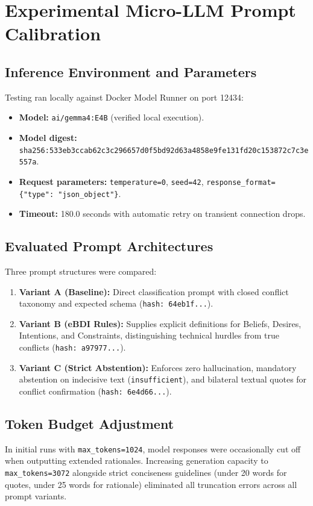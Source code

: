 \documentclass[11pt,a4paper]{article}
\begin{document}
\section{Experimental Micro-LLM Prompt Calibration}

\subsection{Inference Environment and Parameters}
Testing ran locally against Docker Model Runner on port 12434:
\begin{itemize}[itemsep=2pt]
    \item \textbf{Model:} \texttt{ai/gemma4:E4B} (verified local execution).
    \item \textbf{Model digest:} \texttt{sha256:533eb3ccab62c3c296657d0f5bd92d63a4858e9fe131fd20c153872c7c3e557a}.
    \item \textbf{Request parameters:} \texttt{temperature=0}, \texttt{seed=42}, \texttt{response\_format=\{"type": "json\_object"\}}.
    \item \textbf{Timeout:} 180.0 seconds with automatic retry on transient connection drops.
\end{itemize}

\subsection{Evaluated Prompt Architectures}
Three prompt structures were compared:
\begin{enumerate}[itemsep=2pt]
    \item \textbf{Variant A (Baseline):} Direct classification prompt with closed conflict taxonomy and expected schema (\texttt{hash: 64eb1f...}).
    \item \textbf{Variant B (eBDI Rules):} Supplies explicit definitions for Beliefs, Desires, Intentions, and Constraints, distinguishing technical hurdles from true conflicts (\texttt{hash: a97977...}).
    \item \textbf{Variant C (Strict Abstention):} Enforces zero hallucination, mandatory abstention on indecisive text (\texttt{insufficient}), and bilateral textual quotes for conflict confirmation (\texttt{hash: 6e4d66...}).
\end{enumerate}

\subsection{Token Budget Adjustment}
In initial runs with \texttt{max\_tokens=1024}, model responses were occasionally cut off when outputting extended rationales. Increasing generation capacity to \texttt{max\_tokens=3072} alongside strict conciseness guidelines (under 20 words for quotes, under 25 words for rationale) eliminated all truncation errors across all prompt variants.
\end{document}
